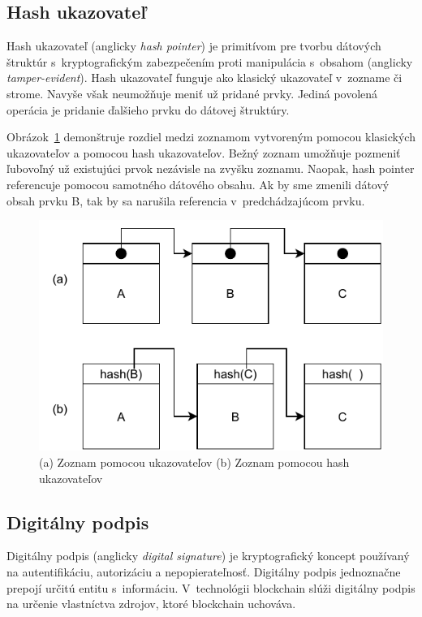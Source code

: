 \subsection{Hash ukazovateľ}\label{subsec:hash-pointer}
Hash ukazovateľ (anglicky \textit{hash pointer}) je primitívom pre tvorbu dátových štruktúr s~kryptografickým zabezpečením proti manipulácia s~obsahom (anglicky \textit{tamper-evident}). Hash ukazovateľ funguje ako klasický ukazovateľ v~zozname či strome. Navyše však neumožňuje meniť už pridané prvky. Jediná povolená operácia je pridanie ďalšieho prvku do dátovej štruktúry. 

Obrázok~\ref{img:hash-pointer} demonštruje rozdiel medzi zoznamom vytvoreným pomocou klasických ukazovateľov a pomocou hash ukazovateľov. Bežný zoznam umožňuje pozmeniť ľubovoľný už existujúci prvok nezávisle na zvyšku zoznamu. Naopak, hash pointer referencuje pomocou samotného dátového obsahu. Ak by sme zmenili dátový obsah prvku B, tak by sa narušila referencia v~predchádzajúcom prvku.
~\cite{horizenAcademy, narayanan2016bitcoin}


\begin{figure}[bt]
	\centering
	\includegraphics[width=.6\textwidth]{obrazky-figures/hash-pointer}
	\caption{(a) Zoznam pomocou ukazovateľov \medspace (b) Zoznam pomocou hash ukazovateľov}
	\label{img:hash-pointer}
\end{figure}

\subsection{Digitálny podpis}\label{subsec:sign}
Digitálny podpis (anglicky \textit{digital signature}) je kryptografický koncept používaný na autentifikáciu, autorizáciu a nepopierateľnosť. Digitálny podpis jednoznačne prepojí určitú entitu s~informáciu. V~technológii blockchain slúži digitálny podpis na určenie vlastníctva zdrojov, ktoré blockchain uchováva.~\cite{cryptoHandbook, satoshiBitcoin}

